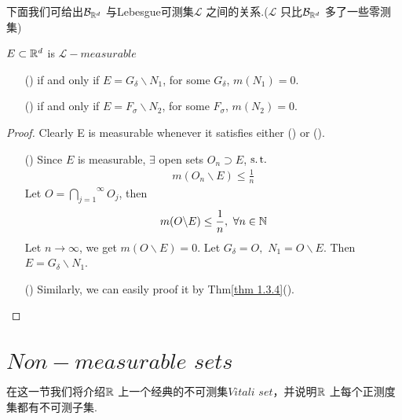 	\vspace{2em}
	下面我们可给出$\mathcal{B}_{\mathbb{R}^d}$ 与Lebesgue可测集$\mathcal{L}$ 之间的关系.($\mathcal{L}$ 只比$\mathcal{B}_{\mathbb{R}^d}$ 多了一些零测集)
	\begin{thm}\label{thm 1.4.1}
		$E \subset \mathbb{R}^d$ is $\mathcal{L}-measurable$
		\begin{enumerate}
			\item[(\rmnum{1})]if and only if $E = G_\delta \backslash N_1$, for some $G_\delta$, $m(N_1) = 0$.
			
			\item[(\rmnum{2})]if and only if $E = F_\sigma \backslash N_2$, for some $F_\sigma$, $m(N_2) = 0$.
		\end{enumerate}
	
		\vspace{2em}
		\begin{proof}
			Clearly E is measurable whenever it satisfies either () or ().
			\begin{enumerate}
				\item[(\rmnum{1})]Since $E$ is measurable, $\exists$ open sets $O_n \supset E$, $\operatorname{s.t.}$
				\begin{align}
					m(O_n \backslash E) \leq \frac{1}{n}
				\end{align}
				Let $O = \overset{\infty}{\underset{j = 1}{\bigcap}}{O_j}$, then
				\begin{align}
					m(O \backslash E) \leq \frac{1}{n} , \,\, \forall n \in \mathbb{N}
				\end{align}
				Let $n \to \infty$, we get $m(O \backslash E) = 0$. Let $G_\delta = O , \,\, N_1 = O \backslash E$. Then $E = G_\delta \backslash N_1$.
				
				\item[()]Similarly, we can easily proof it by Thm\ref{thm 1.3.4}(\rmnum{2}).
			\end{enumerate}
		\end{proof}
	\end{thm}

\newpage
\section{$Non-measurable \,\, sets$}
	在这一节我们将介绍$\mathbb{R}$ 上一个经典的不可测集$Vitali \,\, set$，并说明$\mathbb{R}$ 上每个正测度集都有不可测子集.
